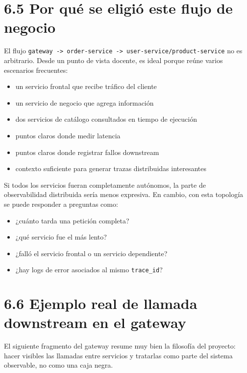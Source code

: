 \documentclass[
a4paper,
12pt]{report}
\providecommand{\tightlist}{%
  \setlength{\itemsep}{0pt}\setlength{\parskip}{0pt}}
\begin{document}
\section{6.5 Por qué se eligió este flujo de
negocio}\label{por-quuxe9-se-eligiuxf3-este-flujo-de-negocio}

El flujo
\texttt{gateway\ -\textgreater{}\ order-service\ -\textgreater{}\ user-service/product-service}
no es arbitrario. Desde un punto de vista docente, es ideal porque reúne
varios escenarios frecuentes:

\begin{itemize}
\tightlist
\item
  un servicio frontal que recibe tráfico del cliente
\item
  un servicio de negocio que agrega información
\item
  dos servicios de catálogo consultados en tiempo de ejecución
\item
  puntos claros donde medir latencia
\item
  puntos claros donde registrar fallos downstream
\item
  contexto suficiente para generar trazas distribuidas interesantes
\end{itemize}

Si todos los servicios fueran completamente autónomos, la parte de
observabilidad distribuida sería menos expresiva. En cambio, con esta
topología se puede responder a preguntas como:

\begin{itemize}
\tightlist
\item
  ¿cuánto tarda una petición completa?
\item
  ¿qué servicio fue el más lento?
\item
  ¿falló el servicio frontal o un servicio dependiente?
\item
  ¿hay logs de error asociados al mismo \texttt{trace\_id}?
\end{itemize}

\section{6.6 Ejemplo real de llamada downstream en el
gateway}\label{ejemplo-real-de-llamada-downstream-en-el-gateway}

El siguiente fragmento del gateway resume muy bien la filosofía del
proyecto: hacer visibles las llamadas entre servicios y tratarlas como
parte del sistema observable, no como una caja negra.
\end{document}

